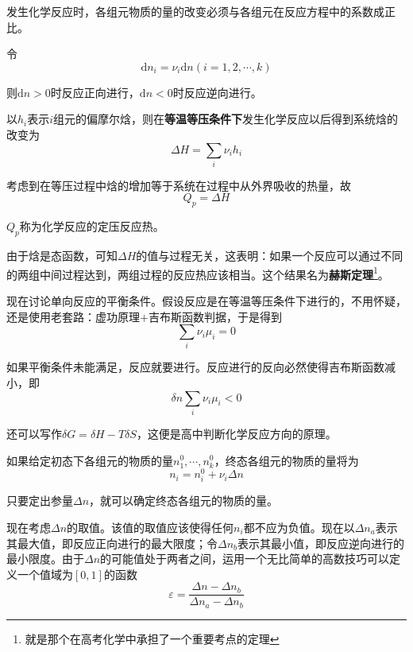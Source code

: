 \documentclass[UTF8]{ctexart}
\newcommand{\dif}{\mathrm{d}}
\begin{document}
\noindent 发生化学反应时，各组元物质的量的改变必须与各组元在反应方程中的系数成正比。

	令
	\begin{equation}
	\mathrm{d} n_{i}=\nu_{i} \mathrm{d} n(i=1,2, \cdots, k)
	\end{equation}
	
\noindent 则$ \dif n >0 $时反应正向进行，$ \dif n<0 $时反应逆向进行。
	
	以$ h_{i} $表示$ i $组元的偏摩尔焓，则在\textbf{等温等压条件下}发生化学反应以后得到系统焓的改变为
	\begin{equation}
	\Delta H=\sum_{i} \nu_{i} h_{i}
	\end{equation}
	
\noindent 考虑到在等压过程中焓的增加等于系统在过程中从外界吸收的热量，故
\begin{equation}
Q_{p}=\Delta H
\end{equation}

\noindent $ Q_{p} $称为化学反应的定压反应热。

	由于焓是态函数，可知$ \Delta H $的值与过程无关，这表明：如果一个反应可以通过不同的两组中间过程达到，两组过程的反应热应该相当。这个结果名为\textbf{赫斯定理}\footnote{就是那个在高考化学中承担了一个重要考点的定理}。
	
	现在讨论单向反应的平衡条件。假设反应是在等温等压条件下进行的，不用怀疑，还是使用老套路：虚功原理$ + $吉布斯函数判据，于是得到
	\begin{equation}
	\sum_{i} \nu_{i} \mu_{i}=0
	\end{equation}
	
\noindent 如果平衡条件未能满足，反应就要进行。反应进行的反向必然使得吉布斯函数减小，即
\begin{equation}
\delta n \sum_{i} \nu_{i} \mu_{i}<0
\end{equation}

\noindent 还可以写作$ \delta G = \delta H - T \delta S $，这便是高中判断化学反应方向的原理。

	如果给定初态下各组元的物质的量$ n_{1}^{0},\cdots,n_{k}^{0} $，终态各组元的物质的量将为
	\begin{equation}
	n_{i}=n_{i}^{0}+\nu_{i} \Delta n
	\end{equation}

\noindent 只要定出参量$ \Delta n $，就可以确定终态各组元的物质的量。

	现在考虑$ \Delta n $的取值。该值的取值应该使得任何$ n_{i} $都不应为负值。现在以$ \Delta n_{a} $表示其最大值，即反应正向进行的最大限度；令$ \Delta n_{b} $表示其最小值，即反应逆向进行的最小限度。由于$ \Delta n $的可能值处于两者之间，运用一个无比简单的高数技巧可以定义一个值域为$ [0,1] $的函数
	\begin{equation}
	\varepsilon=\frac{\Delta n-\Delta n_{b}}{\Delta n_{a}-\Delta n_{b}}
	\end{equation}
	
\end{document}

